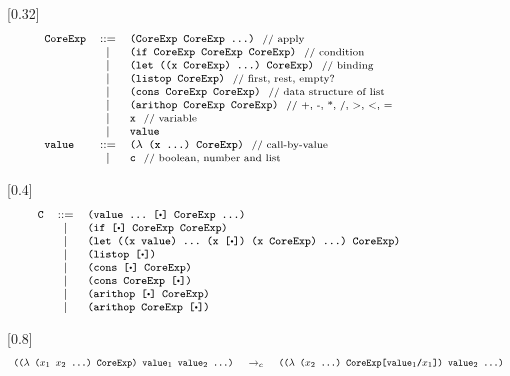 \begin{figure*}[thb]
\begin{centering}
[0.32\linewidth]{
\[
{\footnotesize
		\begin{array}{lcl}
		\mbox{\tt CoreExp} &::=& \texttt{(CoreExp~CoreExp~...)} ~~\mbox{{\scriptsize // apply}}\\
		
		&|& \mbox{\tt (if~CoreExp~CoreExp~CoreExp)} ~~\mbox{{\scriptsize // condition}}\\
		&|& \mbox{\tt (let~((x~CoreExp)~...)~CoreExp)} ~~\mbox{{\scriptsize // binding}}\\
		&|& \mbox{\tt (listop~CoreExp)} ~~\mbox{{\scriptsize // first, rest, empty?}}\\
		&|& \mbox{\tt (cons~CoreExp~CoreExp)} ~~\mbox{{\scriptsize // data structure of list}}\\
		&|& \mbox{\tt (arithop~CoreExp~CoreExp)} ~~\mbox{{\scriptsize // +, -, *, /, >, <, =}}\\
		&|& \mbox{\tt x} ~~\mbox{{\scriptsize // variable}}\\
		&|& \mbox{\tt value}\\
		\mbox{\tt value} &::=& \mbox{\tt ($\lambda$~(x~...)~CoreExp)} ~~\mbox{{\scriptsize // call-by-value}}\\
		&|& \mbox{\tt c} ~~\mbox{{\scriptsize // boolean, number and list}}
		\end{array}
}
\]
}

[0.4\linewidth]{
\[
{\footnotesize
		\begin{array}{lcl}	
		\Code{C} &::=& \Code{(value~...~[$\bigcdot$]~CoreExp~...)}\\
		&|& \Code{(if~[$\bigcdot$]~CoreExp~CoreExp)}\\
		&|& \Code{(let~((x~value)~...~(x~[$\bigcdot$])~(x~CoreExp)~...)~CoreExp)}\\
		&|& \Code{(listop~[$\bigcdot$])}\\
		&|& \Code{(cons~[$\bigcdot$]~CoreExp)}\\
		&|& \Code{(cons~CoreExp~[$\bigcdot$])}\\
		&|& \Code{(arithop~[$\bigcdot$]~CoreExp)}\\
		&|& \Code{(arithop~CoreExp~[$\bigcdot$])}
		\end{array}
}
\]
}

[0.8\linewidth]{
\[
{\footnotesize
		\begin{array}{lcl}	
		\texttt{(($\lambda$~($x_1$~$x_2$~...)~CoreExp)~$\mbox{\tt value}_1$~$\mbox{\tt value}_2$~...)} &~\rightarrow_c~& \texttt{(($\lambda$~($x_2$~...)~CoreExp[$\mbox{\tt value}_1$/$x_1$])~$\mbox{\tt value}_2$~...)}\\


\end{array}}\]}
\end{centering}
\end{figure*}
